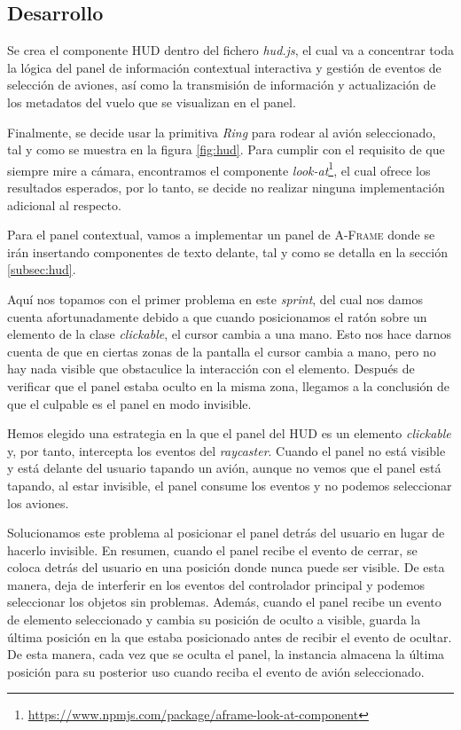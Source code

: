 \documentclass[a4paper, 11pt]{book}
\begin{document}
\subsection{Desarrollo}
Se crea el componente \textsc{HUD} dentro del fichero \emph{hud.js}, el cual va a concentrar toda la lógica del panel de información contextual interactiva y gestión de eventos de selección de aviones, así como la transmisión de información y actualización de los metadatos del vuelo que se visualizan en el panel. 

Finalmente, se decide usar la primitiva \emph{Ring} para rodear al avión seleccionado, tal y como se muestra en la figura \ref{fig:hud}. Para cumplir con el requisito de que siempre mire a cámara, encontramos el componente \emph{look-at}\footnote{\url{https://www.npmjs.com/package/aframe-look-at-component}}, el cual ofrece los resultados esperados, por lo tanto, se decide no realizar ninguna implementación adicional al respecto.

Para el panel contextual, vamos a implementar un panel de \textsc{A-Frame} donde se irán insertando componentes de texto delante, tal y como se detalla en la sección \ref{subsec:hud}. 

Aquí nos topamos con el primer problema en este \emph{sprint}, del cual nos damos cuenta afortunadamente debido a que cuando posicionamos el ratón sobre un elemento de la clase \emph{clickable}, el cursor cambia a una mano. Esto nos hace darnos cuenta de que en ciertas zonas de la pantalla el cursor cambia a mano, pero no hay nada visible que obstaculice la interacción con el elemento. Después de verificar que el panel estaba oculto en la misma zona, llegamos a la conclusión de que el culpable es el panel en modo invisible.

Hemos elegido una estrategia en la que el panel del \textsc{HUD} es un elemento \emph{clickable} y, por tanto, intercepta los eventos del \emph{raycaster}. Cuando el panel no está visible y está delante del usuario tapando un avión, aunque no vemos que el panel está tapando, al estar invisible, el panel consume los eventos y no podemos seleccionar los aviones.

Solucionamos este problema al posicionar el panel detrás del usuario en lugar de hacerlo invisible. En resumen, cuando el panel recibe el evento de cerrar, se coloca detrás del usuario en una posición donde nunca puede ser visible. De esta manera, deja de interferir en los eventos del controlador principal y podemos seleccionar los objetos sin problemas.
Además, cuando el panel recibe un evento de elemento seleccionado y cambia su posición de oculto a visible, guarda la última posición en la que estaba posicionado antes de recibir el evento de ocultar. De esta manera, cada vez que se oculta el panel, la instancia almacena la última posición para su posterior uso cuando reciba el evento de avión seleccionado.\\
\end{document}
